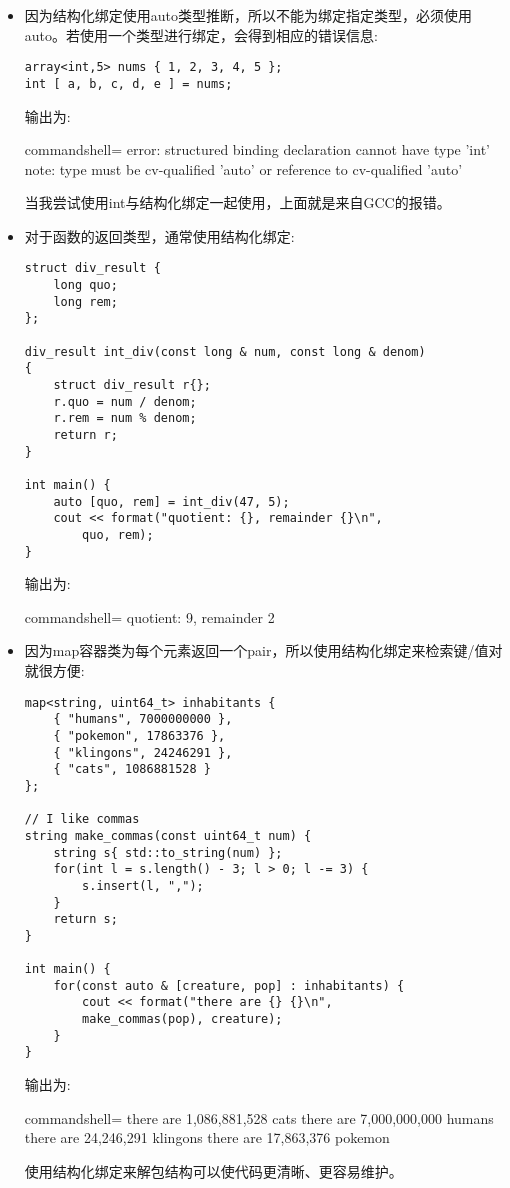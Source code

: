 \begin{itemize}
\item 
因为结构化绑定使用auto类型推断，所以不能为绑定指定类型，必须使用auto。若使用一个类型进行绑定，会得到相应的错误信息:

\begin{lstlisting}[style=styleCXX]
array<int,5> nums { 1, 2, 3, 4, 5 };
int [ a, b, c, d, e ] = nums;
\end{lstlisting}

输出为:

\begin{tcblisting}{commandshell={}}
error: structured binding declaration cannot have type 'int'
note: type must be cv-qualified 'auto' or reference to
cv-qualified 'auto'
\end{tcblisting}

当我尝试使用int与结构化绑定一起使用，上面就是来自GCC的报错。

\item 
对于函数的返回类型，通常使用结构化绑定:

\begin{lstlisting}[style=styleCXX]
struct div_result {
	long quo;
	long rem;
};

div_result int_div(const long & num, const long & denom)
{
	struct div_result r{};
	r.quo = num / denom;
	r.rem = num % denom;
	return r;
}

int main() {
	auto [quo, rem] = int_div(47, 5);
	cout << format("quotient: {}, remainder {}\n",
		quo, rem);
}
\end{lstlisting}

输出为:

\begin{tcblisting}{commandshell={}}
quotient: 9, remainder 2
\end{tcblisting}

\item 
因为map容器类为每个元素返回一个pair，所以使用结构化绑定来检索键/值对就很方便:

\begin{lstlisting}[style=styleCXX]
map<string, uint64_t> inhabitants {
	{ "humans", 7000000000 },
	{ "pokemon", 17863376 },
	{ "klingons", 24246291 },
	{ "cats", 1086881528 }
};

// I like commas
string make_commas(const uint64_t num) {
	string s{ std::to_string(num) };
	for(int l = s.length() - 3; l > 0; l -= 3) {
		s.insert(l, ",");
	}
	return s;
}

int main() {
	for(const auto & [creature, pop] : inhabitants) {
		cout << format("there are {} {}\n",
		make_commas(pop), creature);
	}
}
\end{lstlisting}

输出为:

\begin{tcblisting}{commandshell={}}
there are 1,086,881,528 cats
there are 7,000,000,000 humans
there are 24,246,291 klingons
there are 17,863,376 pokemon
\end{tcblisting}

使用结构化绑定来解包结构可以使代码更清晰、更容易维护。
\end{itemize}












